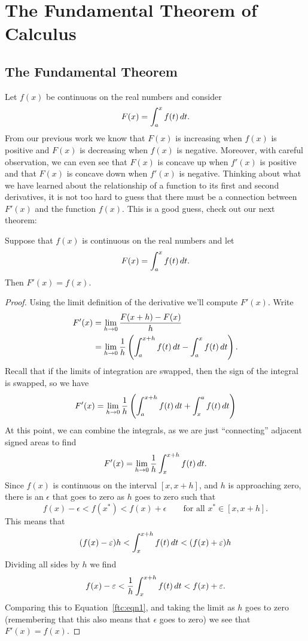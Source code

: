 \chapter{The Fundamental Theorem of Calculus}

\section{The Fundamental Theorem}

Let $f(x)$ be continuous on the real numbers and consider
\[
  F(x) = \int_a^x f(t)\, d t.
\]
From our previous work we know that $F(x)$ is increasing when $f(x)$
is positive and $F(x)$ is decreasing when $f(x)$ is negative. Moreover,
with careful observation, we can even see that $F(x)$ is concave up
when $f'(x)$ is positive and that $F(x)$ is concave down when $f'(x)$
is negative. Thinking about what we have learned about the
relationship of a function to its first and second derivatives, it is
not too hard to guess that there must be a connection between $F'(x)$
and the function $f(x)$. This is a good guess, check out our next
theorem:


\begin{mainTheorem}
\label{thm:fundamental_theorem_I}\hfil

\noindent Suppose that $f(x)$ is continuous on the real numbers and let
\[
  F(x)=\int_a^x f(t)\, d t.
\]
Then $F'(x)=f(x)$.
\end{mainTheorem}

\begin{proof}
Using the limit definition of the derivative we'll compute $F'(x)$.
Write
\begin{align*}
F'(x) &= \lim_{h\to 0}\frac{F(x+h)-F(x)}{h}\\ 
&=\lim_{h\to 0}\frac{1}{h}\left( \int_a^{x+h} f(t)\, d t - \int_a^x f(t)\, d t\right).
\end{align*}
Recall that if the limits of integration are swapped, then the sign
of the integral is swapped, so we have
\[
F'(x) =\lim_{h\to 0} \frac{1}{h}\left( \int_a^{x+h} f(t)\, d t + \int_x^a f(t)\, d t\right)
\]
At this point, we can combine the integrals, as we are just ``connecting'' adjacent signed areas to find
\begin{equation}\label{ftc:eqn1}
F'(x)=\lim_{h\to 0} \frac{1}{h}\int_x^{x+h} f(t)\d t.
\end{equation}
Since $f(x)$ is continuous on the interval $[x,x+h]$, and $h$ is
approaching zero, there is an $\epsilon$ that goes to zero as $h$ goes
to zero such that
\[
f(x)-\epsilon < f(x^*) < f(x) + \epsilon \qquad \text{for all }x^*\in[x,x+h].
\]
This means that 
\[
(f(x) - \varepsilon)h < \int_x^{x+h} f(t)\, d t < (f(x) + \varepsilon)h
\]
Dividing all sides by $h$ we find
\[
f(x) - \varepsilon < \frac{1}{h}\int_x^{x+h} f(t)\, d t < f(x) + \varepsilon.
\]
Comparing this to Equation~\ref{ftc:eqn1}, and taking the limit as $h$
goes to zero (remembering that this also means that $\epsilon$ goes to
zero) we see that $F'(x) = f(x)$.
\end{proof}

